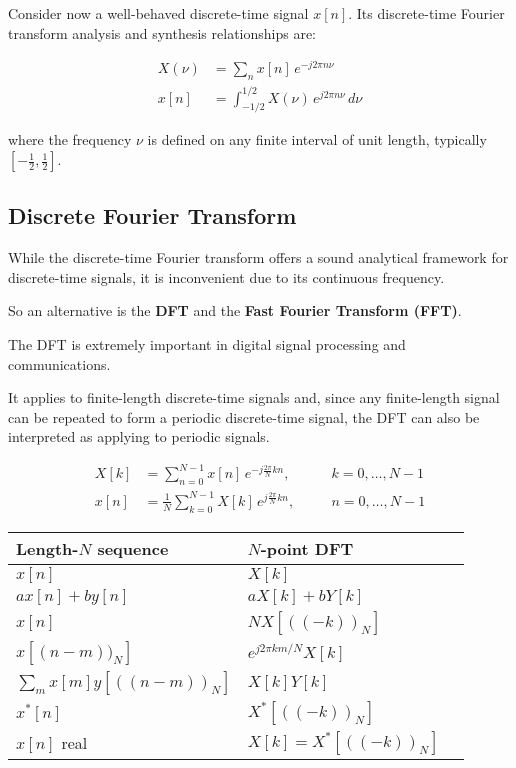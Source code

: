 Consider now a well-behaved discrete-time signal $x[n]$.  
Its discrete-time Fourier transform analysis and synthesis relationships are:

\begin{align}
X(\nu) &= \sum_{n} x[n]\,e^{-j 2\pi n \nu} \tag{A.7} \\[6pt]
x[n] &= \int_{-1/2}^{1/2} X(\nu)\,e^{j 2\pi n \nu}\,d\nu \tag{A.8}
\end{align}

where the frequency $\nu$ is defined on any finite interval of unit length, typically $[-\tfrac{1}{2}, \tfrac{1}{2}]$.

\subsection*{Discrete Fourier Transform}

While the discrete-time Fourier transform offers a sound analytical framework for discrete-time signals, it is inconvenient due to its continuous frequency.

So an alternative is the \textbf{DFT} and the \textbf{Fast Fourier Transform (FFT)}.

The DFT is extremely important in digital signal processing and communications.

It applies to finite-length discrete-time signals and, since any finite-length signal can be repeated to form a periodic discrete-time signal, the DFT can also be interpreted as applying to periodic signals.

\begin{align}
X[k] &= \sum_{n=0}^{N-1} x[n]\,e^{-j\frac{2\pi}{N}kn}, \quad && k = 0, \ldots, N-1 \tag{A.9} \\[6pt]
x[n] &= \frac{1}{N} \sum_{k=0}^{N-1} X[k]\,e^{j\frac{2\pi}{N}kn}, \quad && n = 0, \ldots, N-1 \tag{A.10}
\end{align}

\begin{center}
\begin{tabular}{@{}lll@{}}
\toprule
\textbf{Length-$N$ sequence} & \textbf{$N$-point DFT} \\ \midrule
$x[n]$ & $X[k]$ \\
$a x[n] + b y[n]$ & $a X[k] + b Y[k]$ \\
$x[n]$ & $N X[((-k))_N]$ \\
$x[(n - m))_N]$ & $e^{j 2\pi k m / N} X[k]$ \\
$\sum\limits_m x[m] y[((n - m))_N]$ & $X[k] Y[k]$ \\
$x^*[n]$ & $X^*[((-k))_N]$ \\
$x[n]$ real & $X[k] = X^*[((-k))_N]$ \\ 
\bottomrule
\end{tabular}
\end{center}

